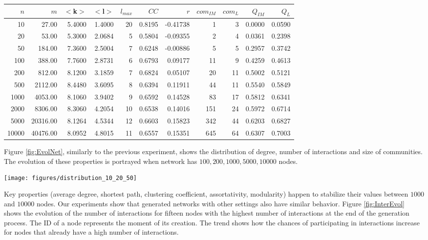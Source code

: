 \begin{table*}[ht]
  \centering
  \caption{Evolution of network properties}
	\begin{tabular}{|r|rrrrrrrrrr|}

\hline
  $n$ & $m$ & $<$k$>$ &  $<$l$>$ & $l_{max}$ & $CC$ & $r$ & $com_{IM}$ & $com_L$ & $Q_{IM}$ & $Q_L$ \\
\hline
  10 & 27.00 & 5.4000 & 1.4000 & 20 & 0.8195 & -0.41738 & 1 & 3 & 0.0000 & 0.0590 \\ 
 20 & 53.00 & 5.3000 & 2.0684 & 5 & 0.5804 & -0.09355 & 2 & 4 & 0.0361 & 0.2398 \\ 
  50 & 184.00 & 7.3600 & 2.5004 & 7 & 0.6248 & -0.00886 & 5 & 5 & 0.2957 & 0.3742 \\ 
100 & 388.00 & 7.7600 & 2.8731 & 6 & 0.6793 & 0.09177 & 11 & 9 & 0.4259 & 0.4613 \\ 
 200 & 812.00 & 8.1200 & 3.1859 & 7 & 0.6824 & 0.05107 & 20 & 11 & 0.5002 & 0.5121 \\ 
500 & 2112.00 & 8.4480 & 3.6095 & 8 & 0.6394 & 0.11911 & 44 & 11 & 0.5540 & 0.5849 \\ 
 1000 & 4053.00 & 8.1060 & 3.9402 & 9 & 0.6592 & 0.14528 & 83 & 17 & 0.5812 & 0.6341 \\ 
2000 & 8306.00 & 8.3060 & 4.2054 & 10 & 0.6538 & 0.14016 & 151 & 24 & 0.5972 & 0.6714 \\ 
5000 & 20316.00 & 8.1264 & 4.5344 & 12 & 0.6603 & 0.15823 & 342 & 44 & 0.6203 & 0.6827 \\ 
10000 & 40476.00 & 8.0952 & 4.8015 & 11 & 0.6557 & 0.15351 & 645 & 64 & 0.6307 & 0.7003 \\ 
\hline
  \end{tabular}
	  \label{tab:Evolut}%
\end{table*}%
	
Figure \ref{fig:EvolNet}, similarly to the previous experiment, shows the distribution of degree, number of interactions and size of communities. The evolution of these properties is portrayed when network has $100, 200, 1000, 5000, 10000$ nodes.

\begin{figure*}[ht]
\centering
\texttt{[image: figures/distribution\_10\_20\_50]}
\caption{Evolution of network (100, 200, 1000, 5000, 10000 nodes)}
\label{fig:EvolNet}
\end{figure*}

Key properties (average degree, shortest path, clustering coefficient, assortativity, modularity) happen to stabilize their values between $1000$ and $10000$ nodes. Our experiments show that  generated networks with other settings also have similar behavior. Figure \ref{fig:InterEvol} shows the evolution of the number of interactions for fifteen nodes with the highest number of interactions at the end of the generation process. The ID of a node represents the moment of its creation. The trend shows how the chances of participating in interactions increase for nodes that already have a high number of interactions.

